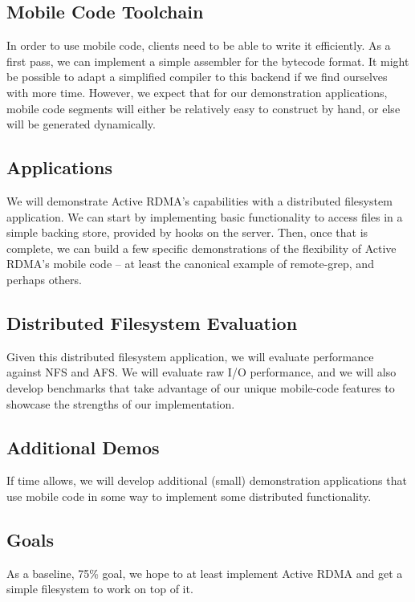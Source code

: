 \documentclass[10pt]{article}
\begin{document}
\subsection{Mobile Code Toolchain}

In order to use mobile code, clients need to be able to write it
efficiently. As a first pass, we can implement a simple assembler for
the bytecode format. It might be possible to adapt a simplified
compiler to this backend if we find ourselves with more time. However,
we expect that for our demonstration applications, mobile code
segments will either be relatively easy to construct by hand, or else
will be generated dynamically.

\subsection{Applications}

We will demonstrate Active RDMA's capabilities with a distributed
filesystem application. We can start by implementing basic
functionality to access files in a simple backing store, provided by
hooks on the server. Then, once that is complete, we can build a few
specific demonstrations of the flexibility of Active RDMA's mobile
code -- at least the canonical example of remote-grep, and perhaps
others.

\subsection{Distributed Filesystem Evaluation}

Given this distributed filesystem application, we will evaluate
performance against NFS and AFS. We will evaluate raw I/O performance,
and we will also develop benchmarks that take advantage of our unique
mobile-code features to showcase the strengths of our implementation.

\subsection{Additional Demos}

If time allows, we will develop additional (small) demonstration
applications that use mobile code in some way to implement some
distributed functionality.

\subsection{Goals}

As a baseline, 75\% goal, we hope to at least implement Active RDMA
and get a simple filesystem to work on top of it.
\end{document}
